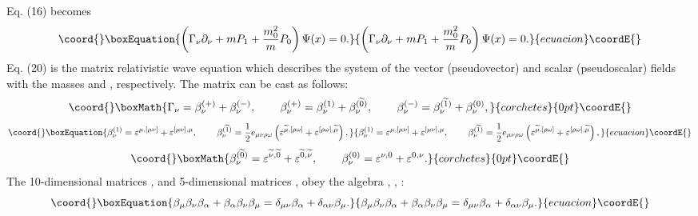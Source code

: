 \documentclass[a4paper,12pt]{article}
\begin{document}
Eq. (16) becomes
\begin{equation}\coord{}\boxEquation{
\left( \Gamma _\nu \partial _\nu +mP_1+\frac{m_0^2}{m}P_0\right)
\Psi (x)=0 . \label{20}
}{
\left( \Gamma _\nu \partial _\nu +mP_1+\frac{m_0^2}{m}P_0\right)
\Psi (x)=0 . }{ecuacion}\coordE{}\end{equation}
Eq. (20) is the matrix relativistic wave equation which describes
the system of the vector (pseudovector) and scalar (pseudoscalar)
fields with the masses \coordHE{} and \coordHE{}, respectively. The \coordHE{}matrix \myHighlight{$\Gamma _\nu $}\coordHE{} can be cast as follows:
\[\coord{}\boxMath{
\Gamma _\nu =\beta _\nu ^{(+)}+\beta _\nu ^{(-)} ,
\hspace{0.3in}\beta _\nu ^{(+)}=\beta _\nu ^{(1)}+\beta _\nu
^{(\widetilde{0})} ,\hspace{0.3in}\beta _\nu ^{(-)}=\beta _\nu
^{(\widetilde{1})}+\beta _\nu ^{(0)} ,
}{corchetes}{0pt}\coordE{}\]
\begin{equation}\coord{}\boxEquation{
\beta _\nu ^{(1)}=\varepsilon ^{\mu ,[\mu \nu ]}+\varepsilon
^{[\mu \nu ],\mu } ,\hspace{0.3in}\beta _\nu
^{(\widetilde{1})}=\frac 12e_{\mu \nu \rho \omega }\left(
\varepsilon ^{\widetilde{\mu },[\rho \omega ]}+\varepsilon ^{[\rho
\omega ],\widetilde{\mu }}\right) , \label{21}
}{
\beta _\nu ^{(1)}=\varepsilon ^{\mu ,[\mu \nu ]}+\varepsilon
^{[\mu \nu ],\mu } ,\hspace{0.3in}\beta _\nu
^{(\widetilde{1})}=\frac 12e_{\mu \nu \rho \omega }\left(
\varepsilon ^{\widetilde{\mu },[\rho \omega ]}+\varepsilon ^{[\rho
\omega ],\widetilde{\mu }}\right) , }{ecuacion}\coordE{}\end{equation}
\[\coord{}\boxMath{
\beta _\nu ^{(\widetilde{0})}=\varepsilon ^{\widetilde{\nu
},\widetilde{0} }+\varepsilon ^{\widetilde{0},\widetilde{\nu }} ,
\hspace{0.3in}\beta _\nu ^{(0)}=\varepsilon ^{\nu ,0}+\varepsilon
^{0,\nu } .
}{corchetes}{0pt}\coordE{}\]
The 10-dimensional matrices \coordHE{}, \coordHE{} and 5-dimensional matrices \coordHE{}, \coordHE{} obey the algebra
\cite{Petiau}, \cite{Duffin}, \cite{Kemmer}:
\begin{equation}\coord{}\boxEquation{
\beta _\mu\beta _\nu \beta _\alpha +\beta _\alpha \beta _\nu \beta
_\mu =\delta _{\mu \nu }\beta _\alpha +\delta _{\alpha \nu }\beta
_\mu  .\label{22}
}{
\beta _\mu\beta _\nu \beta _\alpha +\beta _\alpha \beta _\nu \beta
_\mu =\delta _{\mu \nu }\beta _\alpha +\delta _{\alpha \nu }\beta
_\mu  .}{ecuacion}\coordE{}\end{equation}
\end{document}
